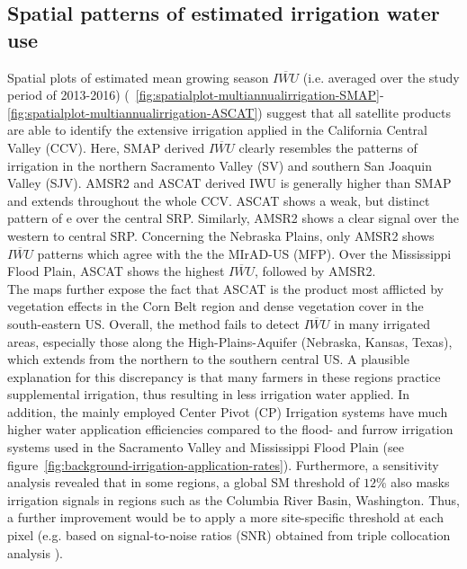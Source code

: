 \documentclass[hess, manuscript]{copernicus}
\begin{document}
\subsection{Spatial patterns of estimated irrigation water use}
\label{ssec:spatial-patterns}
Spatial plots of estimated mean growing season $\overline{IWU}$ (i.e. averaged over the study period of 2013-2016) (~\ref{fig:spatialplot-multiannualirrigation-SMAP}-\ref{fig:spatialplot-multiannualirrigation-ASCAT}) suggest that all satellite products are able to identify the extensive irrigation applied in the California Central Valley (CCV). Here, SMAP derived $\overline{IWU}$ clearly resembles the patterns of irrigation in the northern Sacramento Valley (SV) and southern San Joaquin Valley (SJV). AMSR2 and ASCAT derived IWU is generally higher than SMAP and extends throughout the whole CCV. ASCAT shows a weak, but distinct pattern of e over the central SRP. Similarly, AMSR2 shows a clear signal over the western to central SRP. Concerning the Nebraska Plains, only AMSR2 shows $\overline{IWU}$ patterns which agree with the the MIrAD-US (MFP). Over the Mississippi Flood Plain, ASCAT shows the highest $\overline{IWU}$, followed by AMSR2.\\

The maps further expose the fact that ASCAT is the product most afflicted by vegetation effects in the Corn Belt region and dense vegetation cover in the south-eastern US. Overall, the method fails to detect $\overline{IWU}$ in many irrigated areas, especially those along the High-Plains-Aquifer (Nebraska, Kansas, Texas), which extends from the northern to the southern central US. A plausible explanation for this discrepancy is that many farmers in these regions practice supplemental irrigation, thus resulting in less irrigation water applied. In addition, the mainly employed Center Pivot (CP) Irrigation systems have much higher water application efficiencies compared to the flood- and furrow irrigation systems used in the Sacramento Valley and Mississippi Flood Plain (see figure~\ref{fig:background-irrigation-application-rates}). Furthermore, a sensitivity analysis revealed that in some regions, a global SM threshold of $12\%$ also masks irrigation signals in regions such as the Columbia River Basin, Washington. Thus, a further improvement would be to apply a more site-specific threshold at each pixel (e.g. based on signal-to-noise ratios (SNR) obtained from triple collocation analysis \citep{gruber2016recent}).
\end{document}
